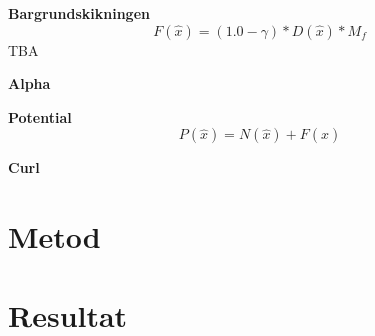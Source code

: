 \documentclass[a4paper]{article}
\begin{document}
\textbf{Bargrundskikningen}
\begin{equation}
    F(\hat{x}) = (1.0-\gamma) * D(\hat{x}) * M_f
\end{equation}
TBA


\textbf{Alpha}

\textbf{Potential}
\begin{equation}
    P(\hat{x}) = N(\hat{x}) + F(\hat{x})
\end{equation}


\textbf{Curl}

    \section{Metod}

    \section{Resultat}
\end{document}
